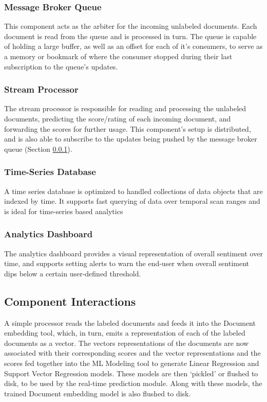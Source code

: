 \documentclass[conference]{IEEEtran}
\begin{document}
        \subsubsection{Message Broker Queue} \label{message_broker_queue}
            This component acts as the arbiter for the incoming unlabeled documents. 
            Each document is read from the queue and is processed in turn.
            The queue is capable of holding a large buffer, as well as an offset for each of it's consumers, to serve as a memory or bookmark of where the consumer stopped during their last subscription to the queue's updates.

        \subsubsection{Stream Processor}
            The stream processor is responsible for reading and processing the unlabeled documents, predicting the score/rating of each incoming document, and forwarding the scores for further usage.
            This component's setup is distributed, and is also able to subscribe to the updates being pushed by the message broker queue (Section \ref{message_broker_queue}). 

        \subsubsection{Time-Series Database}
            A time series database is optimized to handled collections of data objects that are indexed by time. 
            It supports fast querying of data over temporal scan ranges and is ideal for time-series based analytics

        \subsubsection{Analytics Dashboard}
            The analytics dashboard provides a visual representation of overall sentiment over time, and supports setting alerts to warn the end-user when overall sentiment dips below a certain user-defined threshold.

    \subsection{Component Interactions} \label{Component Interactions}
        A simple processor reads the labeled documents and feeds it into the Document embedding tool, which, in turn, emits a representation of each of the labeled documents as a vector.
        The vectors representations of the documents are now associated with their corresponding scores and the vector representations and the scores fed together into the ML Modeling tool to generate Linear Regression and Support Vector Regression models. 
        These models are then `pickled' or flushed to disk, to be used by the real-time prediction module. 
        Along with these models, the trained Document embedding model is also flushed to disk.
\end{document}
